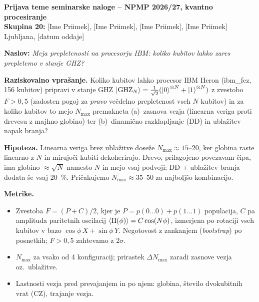 \documentclass[10pt,a4paper]{article}
\begin{document}
{\large\textbf{Prijava teme seminarske naloge -- NPMP 2026/27, kvantno procesiranje}}\\
\textbf{Skupina 20:} [Ime Priimek], [Ime Priimek], [Ime Priimek], [Ime Priimek] \hfill Ljubljana, [datum oddaje]

\medskip
\textbf{Naslov:} \emph{Meja prepletenosti na procesorju IBM: koliko kubitov lahko zares prepletemo v stanje GHZ?}

\textbf{Raziskovalno vprašanje.} Koliko kubitov lahko procesor IBM Heron (ibm\_fez, 156 kubitov) pripravi v stanje GHZ
$\ket{\mathrm{GHZ}_N}=\tfrac{1}{\sqrt2}(\ket{0}^{\otimes N}+\ket{1}^{\otimes N})$ z zvestobo $F>0{,}5$
(zadosten pogoj za \emph{pravo} večdelno prepletenost vseh $N$ kubitov) in za koliko kubitov to mejo $N_{\max}$
premakneta (a)~zasnova vezja (linearna veriga proti drevesu z majhno globino) ter (b)~dinamično razklapljanje (DD) in ublažitev napak branja?

\textbf{Hipoteza.} Linearna veriga brez ublažitve doseže $N_{\max}\approx 15$--$20$, ker globina raste linearno z $N$ in mirujoči kubiti
dekoherirajo. Drevo, prilagojeno povezavam čipa, ima globino $\approx\!\sqrt N$ namesto $N$ in mejo vsaj podvoji;
DD + ublažitev branja dodata še vsaj 20~\%. Pričakujemo $N_{\max}\approx 35$--$50$ za najboljšo kombinacijo.

\textbf{Metrike.}
\begin{itemize}
\item Zvestoba $F=(P+C)/2$, kjer je $P=p(0\dots0)+p(1\dots1)$ populacija, $C$ pa amplituda paritetnih oscilacij
      $\expval{\Pi(\phi)}=C\cos(N\phi)$, izmerjena po rotaciji vseh kubitov v bazo $\cos\phi\,X+\sin\phi\,Y$.
      Negotovost z zankanjem (\emph{bootstrap}) po posnetkih; $F>0{,}5$ zahtevamo z 2$\sigma$.
\item $N_{\max}$ za vsako od 4 konfiguracij; prirastek $\Delta N_{\max}$ zaradi zasnove vezja oz.\ ublažitve.
\item Lastnosti vezja pred prevajanjem in po njem: globina, število dvokubitnih vrat (CZ), trajanje vezja.
\end{itemize}
\end{document}
